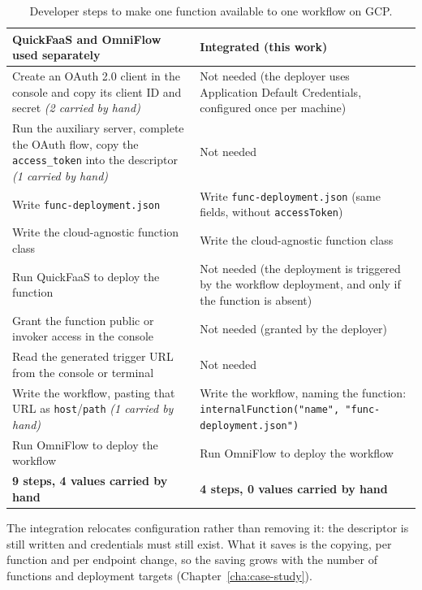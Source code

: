 \begin{table}[!htbp]
  \centering
  \caption{Developer steps to make one function available to one workflow on GCP.}
  \label{tab:eval-manual-effort}
  \begin{tabular}{|p{}|p{}|}
    \hline
    \textbf{QuickFaaS and OmniFlow used separately} & \textbf{Integrated (this work)} \\
    \hline
    Create an OAuth 2.0 client in the console and copy its client ID and secret \emph{(2 carried by
    hand)} & Not needed (the deployer uses Application Default Credentials, configured once per machine)
    \\
    \hline
    Run the auxiliary server, complete the OAuth flow, copy the \texttt{access\_token} into the
    descriptor \emph{(1 carried by hand)} & Not needed \\
    \hline
    Write \texttt{func-deployment.json} & Write \texttt{func-deployment.json} (same fields, without
    \texttt{accessToken}) \\
    \hline
    Write the cloud-agnostic function class & Write the cloud-agnostic function class \\
    \hline
    Run QuickFaaS to deploy the function & Not needed (the deployment is triggered by the workflow
    deployment, and only if the function is absent) \\
    \hline
    Grant the function public or invoker access in the console & Not needed (granted by the deployer) \\
    \hline
    Read the generated trigger URL from the console or terminal & Not needed \\
    \hline
    Write the workflow, pasting that URL as \texttt{host}/\texttt{path} \emph{(1 carried by hand)} &
    Write the workflow, naming the function:
    \texttt{internalFunction("name", "func-deployment.json")} \\
    \hline
    Run OmniFlow to deploy the workflow & Run OmniFlow to deploy the workflow \\
    \hline
    \textbf{9 steps, 4 values carried by hand} & \textbf{4 steps, 0 values carried by hand} \\
    \hline
  \end{tabular}
\end{table}

The integration relocates configuration rather than removing it: the descriptor is still written
and credentials must still exist. What it saves is the copying, per function and per endpoint
change, so the saving grows with the number of functions and deployment targets
(Chapter~\ref{cha:case-study}).

